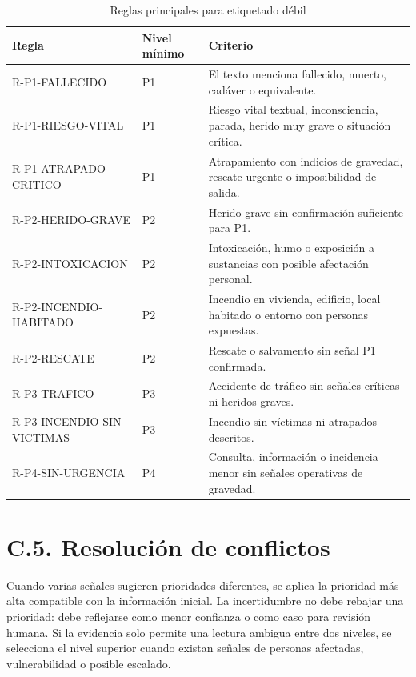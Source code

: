 \begin{table}[ht]
\centering
\caption{Reglas principales para etiquetado débil}
\label{tab:anexoc-reglas}
\scriptsize
\begin{tabularx}{\textwidth}{|p{2.8cm}|p{1.2cm}|X|}
\hline
\textbf{Regla} & \textbf{Nivel mínimo} & \textbf{Criterio} \\ \hline
R-P1-FALLECIDO & P1 & El texto menciona fallecido, muerto, cadáver o equivalente. \\ \hline
R-P1-RIESGO-VITAL & P1 & Riesgo vital textual, inconsciencia, parada, herido muy grave o situación crítica. \\ \hline
R-P1-ATRAPADO-CRITICO & P1 & Atrapamiento con indicios de gravedad, rescate urgente o imposibilidad de salida. \\ \hline
R-P2-HERIDO-GRAVE & P2 & Herido grave sin confirmación suficiente para P1. \\ \hline
R-P2-INTOXICACION & P2 & Intoxicación, humo o exposición a sustancias con posible afectación personal. \\ \hline
R-P2-INCENDIO-HABITADO & P2 & Incendio en vivienda, edificio, local habitado o entorno con personas expuestas. \\ \hline
R-P2-RESCATE & P2 & Rescate o salvamento sin señal P1 confirmada. \\ \hline
R-P3-TRAFICO & P3 & Accidente de tráfico sin señales críticas ni heridos graves. \\ \hline
R-P3-INCENDIO-SIN-VICTIMAS & P3 & Incendio sin víctimas ni atrapados descritos. \\ \hline
R-P4-SIN-URGENCIA & P4 & Consulta, información o incidencia menor sin señales operativas de gravedad. \\ \hline
\end{tabularx}
\end{table}

\section*{C.5. Resolución de conflictos}

Cuando varias señales sugieren prioridades diferentes, se aplica la prioridad más alta
compatible con la información inicial. La incertidumbre no debe rebajar una prioridad:
debe reflejarse como menor confianza o como caso para revisión humana. Si la evidencia
solo permite una lectura ambigua entre dos niveles, se selecciona el nivel superior
cuando existan señales de personas afectadas, vulnerabilidad o posible escalado.

